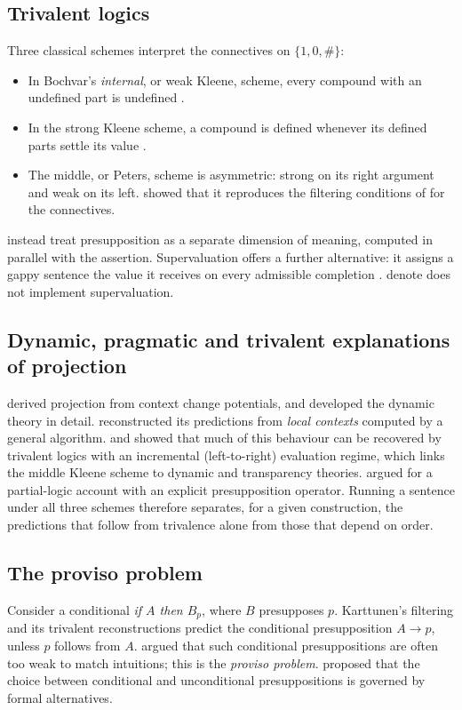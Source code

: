 \documentclass[11pt,a4paper]{article}
\newcommand{\dn}{\textsf{denote}}
\theoremstyle{definition}
\begin{document}
\subsection{Trivalent logics}
Three classical schemes interpret the connectives on $\{1,0,\#\}$:
\begin{itemize}
\item In Bochvar's \emph{internal}, or weak Kleene, scheme, every compound with an undefined part is undefined \citep{bochvar1938}.
\item In the strong Kleene scheme, a compound is defined whenever its defined parts settle its value \citep{kleene1952}.
\item The middle, or Peters, scheme is asymmetric: strong on its right argument and weak on its left. \citet{peters1979} showed that it reproduces the filtering conditions of \citet{karttunen1973,karttunen1974} for the connectives.
\end{itemize}
\citet{karttunenpeters1979} instead treat presupposition as a separate dimension of meaning, computed in parallel with the assertion. Supervaluation offers a further alternative: it assigns a gappy sentence the value it receives on every admissible completion \citep{vanfraassen1966}. \dn{} does not implement supervaluation.

\subsection{Dynamic, pragmatic and trivalent explanations of projection}
\citet{heim1983} derived projection from context change potentials, and \citet{beaver2001} developed the dynamic theory in detail. \citet{schlenker2009} reconstructed its predictions from \emph{local contexts} computed by a general algorithm. \citet{george2008} and \citet{fox2008} showed that much of this behaviour can be recovered by trivalent logics with an incremental (left-to-right) evaluation regime, which links the middle Kleene scheme to dynamic and transparency theories. \citet{beaverkrahmer2001} argued for a partial-logic account with an explicit presupposition operator. Running a sentence under all three schemes therefore separates, for a given construction, the predictions that follow from trivalence alone from those that depend on order.

\subsection{The proviso problem}
Consider a conditional \textit{if $A$ then $B_p$}, where $B$ presupposes $p$. Karttunen's filtering and its trivalent reconstructions predict the conditional presupposition $A\to p$, unless $p$ follows from $A$. \citet{geurts1996} argued that such conditional presuppositions are often too weak to match intuitions; this is the \emph{proviso problem}. \citet{singh2007} proposed that the choice between conditional and unconditional presuppositions is governed by formal alternatives.
\end{document}
